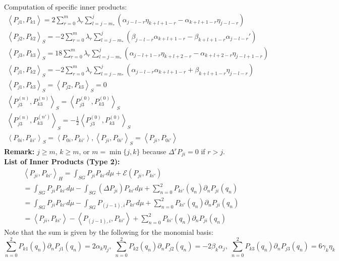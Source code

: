 \documentclass[12pt]{amsart}
\theoremstyle{plain}
\theoremstyle{definition}
\newcommand{\E}{\mathcal{E}}
\newcommand{\inner}[2]{\left \langle #1, #2\right \rangle}
\newcommand{\lap}{\Delta}
\begin{document}
Computation of specific inner products:
\begin{gather*}
    \inner{P_{j1}}{P_{k1}} = 2\sum\limits_{r=0}^{m}\lambda_{r}\sum\limits_{l=j-m_{*}}^{j}\left(\alpha_{j-l-r}\eta_{k+l+1-r}-\alpha_{k+l+1-r}\eta_{j-l-r}\right)\\
    \inner{P_{j2}}{P_{k2}}_S = -2\sum\limits_{r=0}^{m}\lambda_{r}\sum\limits_{l=j-m_{*}}^{j}\left(\beta_{j-l-r}\alpha_{k+l+1-r}-\beta_{k+l+1-r}\alpha_{j-l-r}'\right)\\
    \inner{P_{j3}}{P_{k3}}_S = 18\sum\limits_{r=0}^{m}\lambda_{r}\sum\limits_{l=j-m_{*}}^{j}\left(\alpha_{j-l+1-r}\eta_{k+l+2-r}-\alpha_{k+l+2-r}\eta_{j-l+1-r}\right)\\
    \inner{P_{j1}}{P_{k2}}_S = -2\sum\limits_{r=0}^{m}\lambda_{r}\sum\limits_{l=j-m_{*}}^{j}\left(\alpha_{j-l-r}\alpha_{k+l+1-r}+\beta_{k+l+1-r}\eta_{j-l-r}\right)\\
    \inner{P_{j1}}{P_{k3}}_{S}=\inner{P_{j2}}{P_{k3}}_{S}=0\\
    \inner{P_{j3}^{(n)}}{P_{k3}^{(n)}}_{S}=\inner{P_{j3}^{(0)}}{P_{k3}^{(0)}}_{S}\\
    \inner{P_{j3}^{(n)}}{P_{k3}^{(n')}}_{S}=-\frac{1}{2}\inner{P_{j3}^{(0)}}{P_{k3}^{(0)}}_{S}\\
    \inner{P_{0i}}{P_{ki'}}_{S}=\inner{P_{0i}}{P_{ki'}}, \inner{P_{ji}}{P_{0i'}}_{S}=\inner{P_{ji}}{P_{0i'}}
\end{gather*}
\textbf{Remark:}
$j\geq m$, $k\geq m$, or $m=\min\{j, k\}$ because $\lap^{r}P_{ji}=0$ if $r>j$.
\\
\textbf{List of Inner Products (Type 2):} 
\begin{gather*}
\inner{P_{ji}}{P_{ki'}}_H = \int_{SG} P_{ji}P_{ki'} d \mu  + \E(P_{ji}, P_{ki'})\\
= \int_{SG} P_{ji}P_{ki'} d\mu - \int_{SG} (\lap P_{ji}) P_{ki'} d\mu + \sum_{n = 0}^2 P_{ki'}(q_n)\partial_nP_{ji}(q_n)\\
= \int_{SG} P_{ji}P_{ki'} d\mu - \int_{SG} P_{(j-1),i} P_{ki'} d\mu + \sum_{n = 0}^2 P_{ki'}(q_n)\partial_nP_{ji}(q_n)\\
= \inner{P_{ji}}{P_{ki'}} - \inner{P_{(j-1),i}}{P_{ki'}} + \sum_{n = 0}^2 P_{ki'}(q_n)\partial_nP_{ji}(q_n)
\end{gather*}
Note that the sum is given by the following for the monomial basis:$$
    \sum_{n = 0}^2 P_{k1}(q_n)\partial_nP_{j1}(q_n) = 2\alpha_k\eta_j,\;
    \sum_{n = 0}^2 P_{k2}(q_n)\partial_nP_{j2}(q_n) = -2\beta_k\alpha_j,\;
    \sum_{n = 0}^2 P_{k3}(q_n)\partial_nP_{j3}(q_n) = 6\gamma_k\eta_k$$
\end{document}
